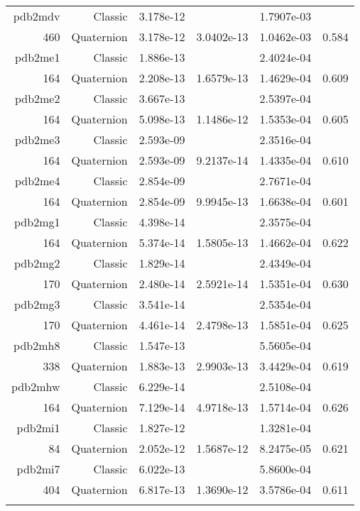 \begin{xltabular}{\textwidth}{r|rS[table-format=1.3e+2]S[table-format=1.4e+2]S[table-format=1.4e+2]S[table-format=-1.3]}
pdb2mdv & Classic & 3.178e-12 &  & 1.7907e-03 & \\
460 & Quaternion & 3.178e-12 & 3.0402e-13 & 1.0462e-03 & 0.584\\  \addlinespace
pdb2me1 & Classic & 1.886e-13 &  & 2.4024e-04 & \\
164 & Quaternion & 2.208e-13 & 1.6579e-13 & 1.4629e-04 & 0.609\\  \addlinespace
pdb2me2 & Classic & 3.667e-13 &  & 2.5397e-04 & \\
164 & Quaternion & 5.098e-13 & 1.1486e-12 & 1.5353e-04 & 0.605\\  \addlinespace
pdb2me3 & Classic & 2.593e-09 &  & 2.3516e-04 & \\
164 & Quaternion & 2.593e-09 & 9.2137e-14 & 1.4335e-04 & 0.610\\  \addlinespace
pdb2me4 & Classic & 2.854e-09 &  & 2.7671e-04 & \\
164 & Quaternion & 2.854e-09 & 9.9945e-13 & 1.6638e-04 & 0.601\\  \addlinespace
pdb2mg1 & Classic & 4.398e-14 &  & 2.3575e-04 & \\
164 & Quaternion & 5.374e-14 & 1.5805e-13 & 1.4662e-04 & 0.622\\  \addlinespace
pdb2mg2 & Classic & 1.829e-14 &  & 2.4349e-04 & \\
170 & Quaternion & 2.480e-14 & 2.5921e-14 & 1.5351e-04 & 0.630\\  \addlinespace
pdb2mg3 & Classic & 3.541e-14 &  & 2.5354e-04 & \\
170 & Quaternion & 4.461e-14 & 2.4798e-13 & 1.5851e-04 & 0.625\\  \addlinespace
pdb2mh8 & Classic & 1.547e-13 &  & 5.5605e-04 & \\
338 & Quaternion & 1.883e-13 & 2.9903e-13 & 3.4429e-04 & 0.619\\  \addlinespace
pdb2mhw & Classic & 6.229e-14 &  & 2.5108e-04 & \\
164 & Quaternion & 7.129e-14 & 4.9718e-13 & 1.5714e-04 & 0.626\\  \addlinespace
pdb2mi1 & Classic & 1.827e-12 &  & 1.3281e-04 & \\
84 & Quaternion & 2.052e-12 & 1.5687e-12 & 8.2475e-05 & 0.621\\  \addlinespace
pdb2mi7 & Classic & 6.022e-13 &  & 5.8600e-04 & \\
404 & Quaternion & 6.817e-13 & 1.3690e-12 & 3.5786e-04 & 0.611\\  \addlinespace

\end{xltabular}
